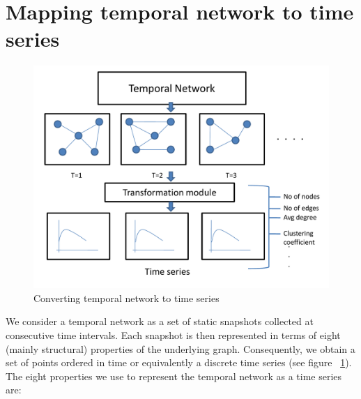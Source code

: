 \noindent
\section{Mapping temporal network to time series}
\label{mapping}

\begin{figure}
 \begin{center}
 \includegraphics*[width=0.7\columnwidth, angle=0]{./texfiles/Chapter_1/fig/Presentation_d-eps-converted-to.pdf}
 \caption{\label{chap_1_fig1}Converting temporal network to time series}
 \end{center}
 \end{figure}

 We consider a temporal network as a set of static snapshots collected at consecutive time intervals. 
Each snapshot is then represented in terms of eight (mainly structural) properties of the underlying graph. 
 Consequently, we obtain a set of points ordered in time or equivalently a discrete time series (see figure ~\ref{chap_1_fig1}). 
The eight properties we use to represent the temporal network as a time series are:
 
